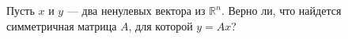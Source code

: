 \documentclass{article}
\begin{document}
Пусть $x$ и $y$ --- два ненулевых вектора из $\mathbb{R}^n$. Верно ли, что найдется
симметричная матрица $A$, для которой $y=Ax$?
\end{document}

